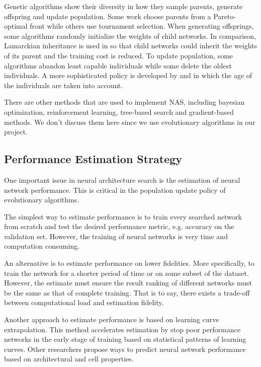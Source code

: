 \documentclass{article}
\begin{document}
\begin{normalsize}
   Genetic algorithms show their diversity in how they sample parents, generate offspring and update population. Some work choose parents from a Pareto-optimal front\cite{elsken2018efficient} while others use tournament selection\cite{liu2018progressive}\cite{real2018regularized}\cite{real2017large}. When generating offsprings, some algorithms randomly initialize the weights of child networks. In comparison, Lamarckian inheritance is used in \cite{elsken2018efficient} so that child networks could inherit the weights of its parent and the training cost is reduced. To update population, some algorithms abandon least capable individuals\cite{real2017large} while some delete the oldest individuals\cite{real2018regularized}. A more sophisticated policy is developed by \cite{Hornby:2006:AAP:1143997.1144142} and \cite{DBLP:journals/corr/abs-1802-01548} in which the age of the individuals are taken into account.
   
   There are other methods that are used to implement NAS, including bayesian optimization, reinforcement learning, tree-based search and gradient-based methods. We don't discuss them here since we use evolutionary algorithms in our project.

   \subsection{Performance Estimation Strategy}
   One important issue in neural architecture search is the estimation of neural network performance. This is critical in the population update policy of evolutionary algorithms. 

   The simplest way to estimate performance is to train every searched network from scratch and test the desired performance metric, e.g. accuracy on the validation set. However, the training of neural networks is very time and computation consuming. 
    
   An alternative is to estimate performance on lower fidelities. More specifically, to train the network for a shorter period of time\cite{zoph2018learning} or on some subset of the dataset\cite{klein2016fast}. However, the estimate must ensure the result ranking of different networks must be the same as that of complete training. That is to say, there exists a trade-off between computational load and estimation fidelity.

   Another approach to estimate performance is based on learning curve extrapolation\cite{domhan2015speeding}. This method accelerates estimation by stop poor performance networks in the early stage of training based on statistical patterns of learning curves. Other researchers propose ways to predict neural network performance based on architectural and cell properties\cite{liu2018progressive}. 
   

\end{normalsize}
\end{document}
